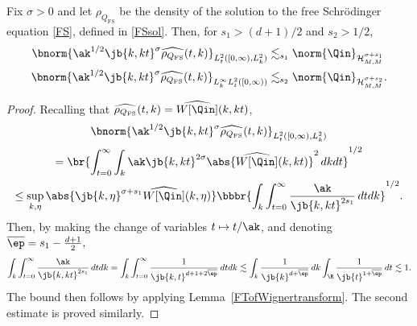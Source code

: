 \begin{lemma}\label{b2b4arenatural}
Fix $\sigma>0$ and let $\rho_{Q_{\mathrm{FS}}}$ be the density of the solution to the free Schrödinger equation \eqref{FS}, defined in \eqref{FSsol}. Then, for $s_1>(d+1)/2$ and $s_2>1/2$,
\begin{align*}
\bnorm{\ak^{1/2}\jb{k,kt}^{\sigma}\widehat{\rho_{Q_{\mathrm{FS}}}}(t,k)}_{L^2_{t}([0,\infty),L^2_k)}&\lesssim_{s_1}\norm{\Qin}_{{\mathcal H^{\sigma+s_1}_{M,M}}}\\
\bnorm{\ak^{1/2}\jb{k,kt}^{\sigma}\widehat{\rho_{Q_{\mathrm{FS}}}}(t,k)}_{L^\infty_kL^2_{t}([0,\infty))}&\lesssim_{s_2}\norm{\Qin}_{{\mathcal H^{\sigma+s_2}_{M,M}}}.
\end{align*}
\end{lemma}
\begin{proof}
Recalling that $\widehat{\rho_{Q_{\mathrm{FS}}}}(t,k)=\widehat{W[\Qin]}(k,kt)$,
\begin{multline*}
\bnorm{\ak^{1/2}\jb{k,kt}^{\sigma}\widehat{\rho_{Q_{\mathrm{FS}}}}(t,k)}_{L^2_{t}([0,\infty),L^2_k)}\\
=\br{\int_{t=0}^{\infty}\int_k\ak\jb{k,kt}^{2\sigma}\abs{\widehat{W[\Qin]}(k,kt)}^2\,dkdt}^{1/2}\\
\leq\sup_{k,\eta}\abs{\jb{k,\eta}^{\sigma+s_1}\widehat{W[\Qin]}(k,\eta)}\bbbr{\int_k\int_{t=0}^{\infty}\frac{\ak}{\jb{k,kt}^{2s_1}}\,dtdk}^{1/2}.
\end{multline*}
Then, by making the change of variables $t\mapsto t/\ak$, and denoting $\overline{\ep}=s_1-\frac{d+1}{2},$
\begin{align*}
\int_k\int_{t=0}^{\infty}\frac{\ak}{\jb{k,kt}^{2s_1}}\,dtdk=\int_k\int_{t=0}^\infty \frac{1}{\jb{k,t}^{d+1+2\overline{\ep}}}\,dtdk\lesssim\int_k\frac{1}{\jb{k}^{d+\overline{\ep}}}\,dk\int_\R\frac{1}{\jb{t}^{1+\overline{\ep}}}\,dt\lesssim1.
\end{align*}The bound then follows by applying Lemma~\ref{FTofWignertransform}. The second estimate is proved similarly.
\end{proof}

